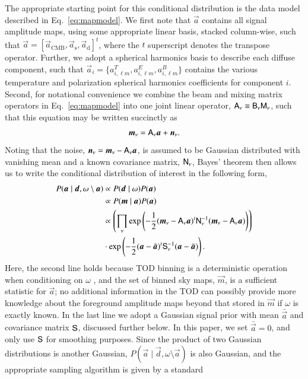 \documentclass[twocolumn]{aa}
\renewcommand{\d}[0]{\vec{d}}
\newcommand{\A}[0]{\tens{A}}
\newcommand{\n}[0]{\vec{n}}
\renewcommand{\a}[0]{\vec{a}}
\newcommand{\m}[0]{\vec{m}}
\newcommand{\B}[0]{\tens{B}}
\newcommand{\N}[0]{\tens{N}}
\newcommand{\M}[0]{\tens{M}}
\renewcommand{\S}[0]{\tens{S}}
\newcommand{\?}[1]{\textcolor{red}{{\bf [#1]}}}
\begin{document}
The appropriate starting point for this conditional distribution is the data
model described in Eq.~\eqref{eq:mapmodel}. We first note that $\a$ contains all
signal amplitude maps, using some appropriate linear basis, stacked column-wise,
such that  $\a = [\a_{\mathrm{CMB}}, \a_{\mathrm{s}}, \a_{\mathrm{d}}]^t$, where
the $t$ superscript denotes the transpose operator. Further, we adopt a spherical
harmonics basis to describe each diffuse component, such that $\a_i =
\{a^T_{i,\ell m},a_{i,\ell m}^E,a_{i,\ell m}^B\}$ contains the various
temperature and polarization spherical harmonics coefficients
\citep{zaldarriaga1997} for component $i$. Second, for notational convenience we
combine the beam and mixing matrix operators in Eq.~\eqref{eq:mapmodel} into one
joint linear operator, $\A_{\nu}\equiv\B_{\nu}\M_{\nu}$, such that this equation
may be written succinctly as
\begin{equation}
  \m_{\nu} = \A_{\nu}\a + \n_{\nu}.
  \label{eq:simple_data_model}
\end{equation}
Noting that the noise, $\n_{\nu} = \m_{\nu} - \A_{\nu}\a$, is
assumed to be Gaussian distributed with vanishing mean and a known covariance 
matrix, $\N_{\nu}$, Bayes' theorem then allows us to write the conditional
distribution of interest in the following form,
\begin{align}
  P(\a\mid\d, \omega\setminus\a) &\propto P(\d\mid\omega)P(\a)\\
  &\propto P(\m\mid\a)P(\a)\\
  & \propto
  \left(\prod_{\nu}\mathrm \exp\left(-\frac{1}{2}(\m_{\nu}-\A_{\nu}\a)^t\N_{\nu}^{-1}(\m_{\nu}-\A_{\nu}\a)\right)\right)\nonumber\\
  &\cdot \mathrm \exp \left(-\frac{1}{2}(\a-\bar{\a})^t\S_{\nu}^{-1}(\a-\bar{\a})\right).
  \label{eq:posterior}
\end{align}
Here, the second line holds because TOD binning is a deterministic operation when
conditioning on $\omega$ \citep{bp01}, and the set of binned sky maps, $\m$, is
a sufficient statistic for $\a$; no additional information in the TOD can possibly
provide more knowledge about the foreground amplitude maps beyond that stored in
$\m$ if $\omega$ is exactly known. In the last line we adopt a Gaussian signal prior with mean $\bar{\a}$ and
covariance matrix $\S$, discussed further below. In this paper, we set
$\bar{\a}=0$, and only use $\S$ for smoothing purposes. Since the product of two
Gaussian distributions is another Gaussian, $P(\a\mid\d, \omega\setminus\a)$ is
also Gaussian, and the appropriate sampling algorithm is given by a standard
\end{document}
